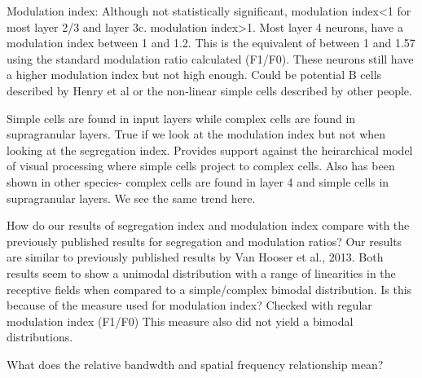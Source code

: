 		Modulation index: Although not statistically significant, modulation index<1 for most layer 2/3 and layer 3c. modulation index>1. Most layer 4 neurons, have a modulation index between 1 and 1.2. This is the equivalent of between 1 and 1.57 using the standard modulation ratio calculated (F1/F0). These neurons still have a higher modulation index but not high enough. Could be potential B cells described by Henry et al or the non-linear simple cells described by other people. 
		
		Simple cells are found in input layers while complex cells are found in supragranular layers. True if we look at the modulation index but not when looking at the segregation index. Provides support against the heirarchical model of visual processing where simple cells project to complex cells. Also has been shown in other species- complex cells are found in layer 4 and simple cells in supragranular layers. We see the same trend here.
		
		How do our results of segregation index and modulation index compare with the previously published results for segregation and modulation ratios?  Our results are similar to previously published results by Van Hooser et al., 2013. Both results seem to show a unimodal distribution with a range of linearities in the receptive fields when compared to a simple/complex bimodal distribution. Is this because of the measure used for modulation index? Checked with regular modulation index (F1/F0) This measure also did not yield a bimodal distributions.
		
		What does the relative bandwdth and spatial frequency relationship mean?
		
		